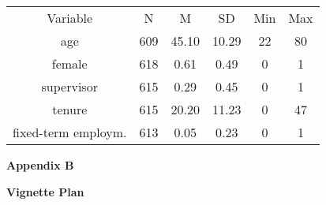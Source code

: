 \documentclass{article}
\begin{document}
\begin{table}

  
\begin{tabular}{c  c  c  c  c  c}

  Variable & N & M & SD & Min & Max\\
age & 609 & 45.10 & 10.29 & 22 & 80\\
female & 618 & 0.61 & 0.49 & 0 & 1\\
supervisor & 615 & 0.29 & 0.45 & 0 & 1\\
tenure & 615 & 20.20 & 11.23 & 0 & 47\\
fixed-term employm. & 613 & 0.05 & 0.23 & 0 & 1\\


\end{tabular}


\end{table}
\textbf{}

\textbf{}

\textbf{Appendix B}

\textbf{Vignette Plan}
\end{document}
